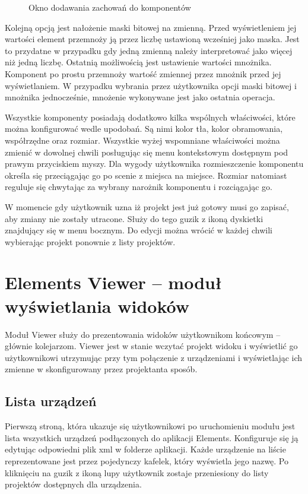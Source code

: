 \begin{itemize}
\begin{figure}[h]
{		}
		\caption{Okno dodawania zachowań do komponentów}
		\label{fig:behaviour}
	\end{figure}
	Kolejną opcją jest nałożenie maski bitowej na zmienną. Przed wyświetleniem jej wartości element przemnoży ją przez liczbę ustawioną wcześniej jako maska. Jest to przydatne w przypadku gdy jedną zmienną należy interpretować jako więcej niż jedną liczbę. Ostatnią możliwością jest ustawienie wartości mnożnika. Komponent po prostu przemnoży wartość zmiennej przez mnożnik przed jej wyświetlaniem. W przypadku wybrania przez użytkownika opcji maski bitowej i mnożnika jednocześnie, mnożenie wykonywane jest jako ostatnia operacja.
\end{itemize}

Wszystkie komponenty posiadają dodatkowo kilka wspólnych właściwości, które można konfigurować wedle upodobań. Są nimi kolor tła, kolor obramowania, współrzędne oraz rozmiar. Wszystkie wyżej wspomniane właściwości można zmienić w dowolnej chwili posługując się menu kontekstowym dostępnym pod prawym przyciskiem myszy.  Dla wygody użytkownika rozmieszczenie komponentu określa się przeciągając go po scenie z miejsca na miejsce. Rozmiar natomiast reguluje się chwytając za wybrany narożnik komponentu i rozciągając go.

W momencie gdy użytkownik uzna iż projekt jest już gotowy musi go zapisać, aby zmiany nie zostały utracone. Służy do tego guzik z ikoną dyskietki znajdujący się w menu bocznym. Do edycji można wrócić w każdej chwili wybierając projekt ponownie z listy projektów.


\section{Elements Viewer – moduł wyświetlania widoków}
Moduł Viewer służy do prezentowania widoków użytkownikom końcowym – głównie kolejarzom. Viewer jest w stanie wczytać projekt widoku i wyświetlić go użytkownikowi utrzymując przy tym połączenie z urządzeniami i wyświetlając ich zmienne w skonfigurowany przez projektanta sposób.

\subsection{Lista urządzeń}
Pierwszą stroną, która ukazuje się użytkownikowi po uruchomieniu modułu jest lista wszystkich urządzeń podłączonych do aplikacji Elements. Konfiguruje się ją edytując odpowiedni plik xml w folderze aplikacji. Każde urządzenie na liście reprezentowane jest przez pojedynczy kafelek, który wyświetla jego nazwę. Po kliknięciu na guzik z ikoną lupy użytkownik zostaje przeniesiony do listy projektów dostępnych dla urządzenia.

